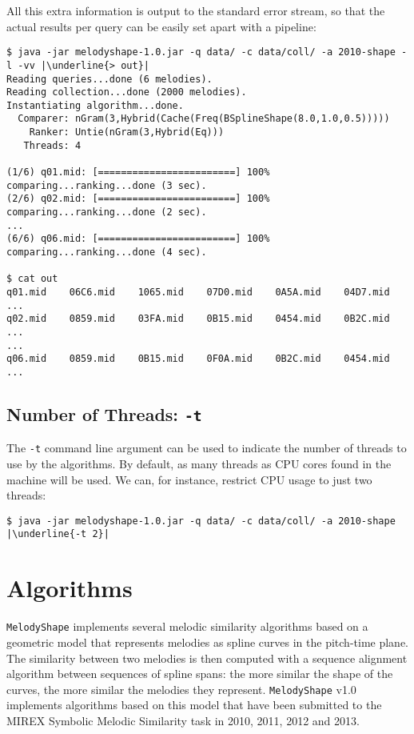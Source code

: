\documentclass[twoside]{article}
\begin{document}
All this extra information is output to the standard error stream, so that the actual results per query can be easily set apart with a pipeline:
\begin{lstlisting}
$ java -jar melodyshape-1.0.jar -q data/ -c data/coll/ -a 2010-shape -l -vv |\underline{> out}|
Reading queries...done (6 melodies).
Reading collection...done (2000 melodies).
Instantiating algorithm...done.
  Comparer: nGram(3,Hybrid(Cache(Freq(BSplineShape(8.0,1.0,0.5)))))
    Ranker: Untie(nGram(3,Hybrid(Eq)))
   Threads: 4
 
(1/6) q01.mid: [========================] 100% comparing...ranking...done (3 sec).
(2/6) q02.mid: [========================] 100% comparing...ranking...done (2 sec).
...
(6/6) q06.mid: [========================] 100% comparing...ranking...done (4 sec).

$ cat out
q01.mid    06C6.mid    1065.mid    07D0.mid    0A5A.mid    04D7.mid ...
q02.mid    0859.mid    03FA.mid    0B15.mid    0454.mid    0B2C.mid ...
...
q06.mid    0859.mid    0B15.mid    0F0A.mid    0B2C.mid    0454.mid ...
\end{lstlisting}

\subsection{Number of Threads: \texttt{-t}}

The \texttt{-t} command line argument can be used to indicate the number of threads to use by the algorithms. By default, as many threads as CPU cores found in the machine will be used. We can, for instance, restrict CPU usage to just two threads:
\begin{lstlisting}
$ java -jar melodyshape-1.0.jar -q data/ -c data/coll/ -a 2010-shape |\underline{-t 2}|
\end{lstlisting}

\section{Algorithms}

\texttt{MelodyShape} implements several melodic similarity algorithms based on a geometric model that represents melodies as spline curves in the pitch-time plane. The similarity between two melodies is then computed with a sequence alignment algorithm between sequences of spline spans: the more similar the shape of the curves, the more similar the melodies they represent. \texttt{MelodyShape} v1.0 implements algorithms based on this model that have been submitted to the MIREX Symbolic Melodic Similarity task in 2010, 2011, 2012 and 2013. 
\end{document}
